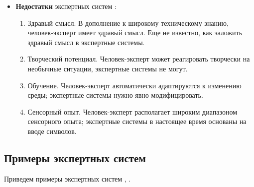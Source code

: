 \begin{itemize}
		\item \textbf{Недостатки} экспертных систем \cite{kb-cons}:
			\begin{enumerate}
				\item Здравый смысл. В дополнение к широкому техническому знанию, человек-эксперт имеет здравый смысл. Еще не известно, как заложить здравый смысл в экспертные системы.
				
				\item Творческий потенциал. Человек-эксперт может реагировать творчески на необычные ситуации, экспертные системы не могут.
				
				\item Обучение. Человек-эксперт автоматически адаптируются к изменению среды; экспертные системы нужно явно модифицировать.
				
				\item Сенсорный опыт. Человек-эксперт располагает широким диапазоном сенсорного опыта; экспертные системы в настоящее время основаны на вводе символов.
			\end{enumerate}
\end{itemize}

\newpage

\subsection{Примеры экспертных систем}

Приведем примеры экспертных систем \cite{examples-1}, \cite{examples-2}.

